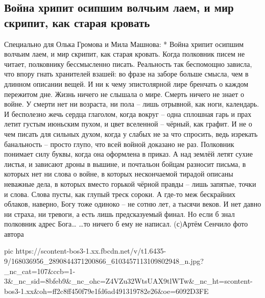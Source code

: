 
 
 
 
 

\subsection{Война хрипит осипшим волчьим лаем, и мир скрипит, как старая кровать}
\label{sec:02_04_2021.fb.makarenko_oksana.1.vojna_smert}

Специально для Олька Громова и Мила Машнова:
*
Война хрипит осипшим волчьим лаем, и мир скрипит, как старая кровать. Когда полковник писем не читает, полковнику бессмысленно писать. Реальность так беспомощно зависла, что впору гнать хранителей взашей: во фразе на заборе больше смысла, чем в длинном описании вещей. И ни к чему эпистолярной лире бренчать о каждом пережитом дне. Жизнь ничего не слышала о мире. Смерть ничего не знает о войне. У смерти нет ни возраста, ни пола – лишь отрывной, как ноги, календарь. И бесполезно жечь сердца глаголом, когда вокруг – одна сплошная гарь и прах летит густым июньским пухом, и цвет вселенной – чёрный, как графит. И не о чем писать для сильных духом, когда у слабых не за что спросить, ведь изрекать банальность – просто глупо, что всей войной доказано не раз. Полковник понимает силу буквы, когда она оформлена в приказ.
А над землёй летят сухие листья, и зависают дроны в вышине, и почтальон бойцам разносит письма, в которых нет ни слова о войне, в которых нескончаемой тирадой описаны неважные дела, в которых вместо горькой чёрной правды – лишь запятые, точки и слова. Слова пусты, как глупый треск сороки. А где-то меж бескрайних облаков, наверно, Богу тоже одиноко – не сотню лет, а тысячи веков. И нет давно ни страха, ни тревоги, а есть лишь предсказуемый финал. Но если б знал полковник адрес Бога…
…то ничего б ему не написал.
(с)Артём Сенчило
фото автора

\ifcmt
  pic https://scontent-bos3-1.xx.fbcdn.net/v/t1.6435-9/168036956_2890844371200866_6103457113109802948_n.jpg?_nc_cat=107&ccb=1-3&_nc_sid=8bfeb9&_nc_ohc=Z4VZu32WtsUAX9tlWTw&_nc_ht=scontent-bos3-1.xx&oh=ff2c8ff450f79e1fd6ad491319782e26&oe=6092D3FE
\fi

